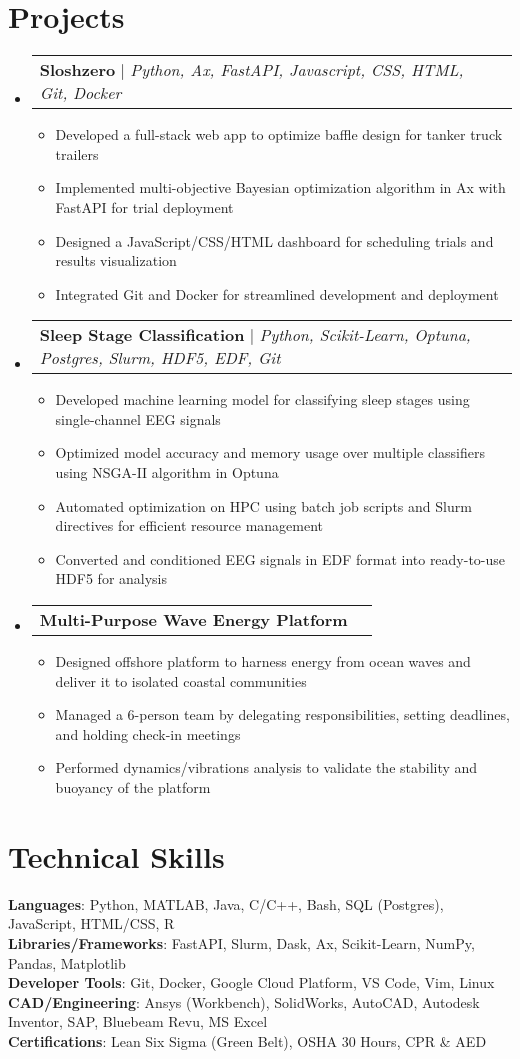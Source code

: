 \documentclass[letterpaper,11pt]{article}
\makeatletter
\newcommand{\resumeItem}[1]{
  \item\small{
    {#1 \vspace{-2pt}}
  }
}
\newcommand{\resumeProjectHeading}[1]{
    \item
    \begin{tabular*}{0.97\textwidth}{l@{\extracolsep{\fill}}r}
      \small#1 \\
    \end{tabular*}\vspace{-7pt}
}
\newcommand{\resumeSubHeadingListStart}{\begin{itemize}[leftmargin=0.15in, label={}]}
\newcommand{\resumeSubHeadingListEnd}{\end{itemize}}
\newcommand{\resumeItemListStart}{\begin{itemize}}
\newcommand{\resumeItemListEnd}{\end{itemize}\vspace{-5pt}}
\makeatother
\begin{document}
\section{Projects}
    \resumeSubHeadingListStart
      \resumeProjectHeading
          {\textbf{Sloshzero} $|$ \emph{Python, Ax, FastAPI, Javascript, CSS, HTML, Git, Docker}}
          \resumeItemListStart
            \resumeItem{Developed a full-stack web app to optimize baffle design for tanker truck trailers}
            \resumeItem{Implemented multi-objective Bayesian optimization algorithm in Ax with FastAPI for trial deployment}
            \resumeItem{Designed a JavaScript/CSS/HTML dashboard for scheduling trials and results visualization}
            \resumeItem{Integrated Git and Docker for streamlined development and deployment}
          \resumeItemListEnd
      \resumeProjectHeading
          {\textbf{Sleep Stage Classification} $|$ \emph{Python, Scikit-Learn, Optuna, Postgres, Slurm, HDF5, EDF, Git}}
          \resumeItemListStart
            \resumeItem{Developed machine learning model for classifying sleep stages using single-channel EEG signals}
            \resumeItem{Optimized model accuracy and memory usage over multiple classifiers using NSGA-II algorithm in Optuna}
            \resumeItem{Automated optimization on HPC using batch job scripts and Slurm directives for efficient resource management}
            \resumeItem{Converted and conditioned EEG signals in EDF format into ready-to-use HDF5 for analysis}
          \resumeItemListEnd
      \resumeProjectHeading
          {\textbf{Multi-Purpose Wave Energy Platform}}
          \resumeItemListStart
            \resumeItem{Designed offshore platform to harness energy from ocean waves and deliver it to isolated coastal communities}
            \resumeItem{Managed a 6-person team by delegating responsibilities, setting deadlines, and holding check-in meetings}
            \resumeItem{Performed dynamics/vibrations analysis to validate the stability and buoyancy of the platform}
          \resumeItemListEnd
    \resumeSubHeadingListEnd



%
\section{Technical Skills}
 \begin{itemize}[leftmargin=0.15in, label={}]
    \small{\item{
     \textbf{Languages}{: Python, MATLAB, Java, C/C++, Bash, SQL (Postgres), JavaScript, HTML/CSS, R} \\
     \textbf{Libraries/Frameworks}{: FastAPI, Slurm, Dask, Ax, Scikit-Learn, NumPy, Pandas, Matplotlib} \\
     \textbf{Developer Tools}{: Git, Docker, Google Cloud Platform, VS Code, Vim, Linux} \\
     \textbf{CAD/Engineering}{: Ansys (Workbench), SolidWorks, AutoCAD, Autodesk Inventor, SAP, Bluebeam Revu, MS Excel} \\ %
     \textbf{Certifications}{: Lean Six Sigma (Green Belt), OSHA 30 Hours, CPR \& AED} \\
    }}
 \end{itemize}


\end{document}
